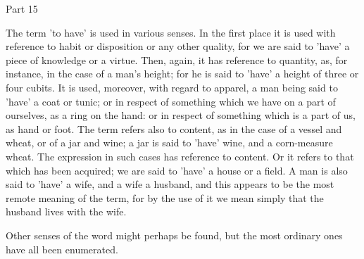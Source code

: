 Part 15

The term 'to have' is used in various senses. In the first place it is
used with reference to habit or disposition or any other quality, for
we are said to 'have' a piece of knowledge or a virtue. Then, again, it
has reference to quantity, as, for instance, in the case of a man's
height; for he is said to 'have' a height of three or four cubits. It
is used, moreover, with regard to apparel, a man being said to 'have' a
coat or tunic; or in respect of something which we have on a part of
ourselves, as a ring on the hand: or in respect of something which is a
part of us, as hand or foot. The term refers also to content, as in the
case of a vessel and wheat, or of a jar and wine; a jar is said to
'have' wine, and a corn-measure wheat. The expression in such cases has
reference to content. Or it refers to that which has been acquired; we
are said to 'have' a house or a field. A man is also said to 'have' a
wife, and a wife a husband, and this appears to be the most remote
meaning of the term, for by the use of it we mean simply that the
husband lives with the wife.

Other senses of the word might perhaps be found, but the most ordinary
ones have all been enumerated.






